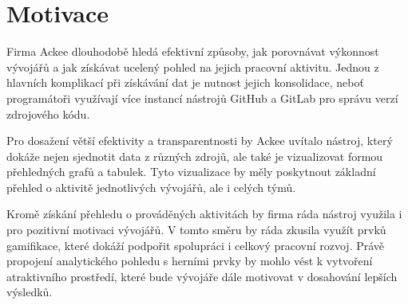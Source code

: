 \section{Motivace}
Firma Ackee dlouhodobě hledá efektivní způsoby, jak porovnávat výkonnost vývojářů a jak získávat ucelený pohled na jejich pracovní aktivitu. Jednou z hlavních komplikací při získávání dat je nutnost jejich konsolidace, neboť programátoři využívají více instancí nástrojů GitHub a GitLab pro správu verzí zdrojového kódu.

Pro dosažení větší efektivity a transparentnosti by Ackee uvítalo nástroj, který dokáže nejen sjednotit data z různých zdrojů, ale také je vizualizovat formou přehledných grafů a tabulek. Tyto vizualizace by měly poskytnout základní přehled o aktivitě jednotlivých vývojářů, ale i celých týmů.

Kromě získání přehledu o prováděných aktivitách by firma ráda nástroj využila i pro pozitivní motivaci vývojářů. V tomto směru by ráda zkusila využít prvků gamifikace, které dokáží podpořit spolupráci i celkový pracovní rozvoj. Právě propojení analytického pohledu s herními prvky by mohlo vést k vytvoření atraktivního prostředí, které bude vývojáře dále motivovat v dosahování lepších výsledků.

